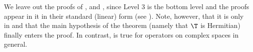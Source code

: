 \documentclass[10pt,twoside]{scrreprt}
\begin{document}
\elevator
We leave out the proofs of ,  and , 
since Level 3 is the bottom level and the proofs appear in it in their standard (linear) form (see ). 
Note, however, that it is only in  and  
that the main hypothesis of the theorem (namely that $\T$ is Hermitian) finally enters the proof.
In contrast,  is true for operators on complex spaces in general.
  
  
\roomservice
\begin{treedef}
\end{treedef}



\end{document}
